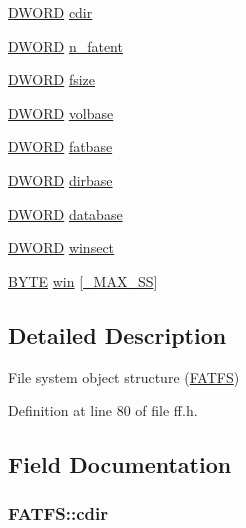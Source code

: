\begin{DoxyCompactItemize}
\item 
\hyperlink{integer_8h_ad342ac907eb044443153a22f964bf0af}{D\-W\-O\-R\-D} \hyperlink{structFATFS_a217d0ce0c8cec84aa7f0c142679412c6}{cdir}
\item 
\hyperlink{integer_8h_ad342ac907eb044443153a22f964bf0af}{D\-W\-O\-R\-D} \hyperlink{structFATFS_a8da50eeba6469bc20d60ca0cf9a1307c}{n\-\_\-fatent}
\item 
\hyperlink{integer_8h_ad342ac907eb044443153a22f964bf0af}{D\-W\-O\-R\-D} \hyperlink{structFATFS_a53e9560659f14e66f306c2c444198bf3}{fsize}
\item 
\hyperlink{integer_8h_ad342ac907eb044443153a22f964bf0af}{D\-W\-O\-R\-D} \hyperlink{structFATFS_a8f0ca578755749d204f59dc83f1a7649}{volbase}
\item 
\hyperlink{integer_8h_ad342ac907eb044443153a22f964bf0af}{D\-W\-O\-R\-D} \hyperlink{structFATFS_a848fba02c4aabe02ef2984e578f33d64}{fatbase}
\item 
\hyperlink{integer_8h_ad342ac907eb044443153a22f964bf0af}{D\-W\-O\-R\-D} \hyperlink{structFATFS_a3f72fd998dbcce4652a85a81fe944bc4}{dirbase}
\item 
\hyperlink{integer_8h_ad342ac907eb044443153a22f964bf0af}{D\-W\-O\-R\-D} \hyperlink{structFATFS_a5b6c0bc2e9fd2ae8ef714210a74a2d5d}{database}
\item 
\hyperlink{integer_8h_ad342ac907eb044443153a22f964bf0af}{D\-W\-O\-R\-D} \hyperlink{structFATFS_ac60e69c00e6bf7c25febfbac4dc1476b}{winsect}
\item 
\hyperlink{integer_8h_a4ae1dab0fb4b072a66584546209e7d58}{B\-Y\-T\-E} \hyperlink{structFATFS_a7cc35a593465e727ab87723c14610644}{win} \mbox{[}\hyperlink{ffconf_8h_ac271b697378912f17132cb9c7d0de024}{\-\_\-\-M\-A\-X\-\_\-\-S\-S}\mbox{]}
\end{DoxyCompactItemize}


\subsection{Detailed Description}
File system object structure (\hyperlink{structFATFS}{F\-A\-T\-F\-S}) 

Definition at line 80 of file ff.\-h.



\subsection{Field Documentation}
\hypertarget{structFATFS_a217d0ce0c8cec84aa7f0c142679412c6}{
\subsubsection[{cdir}]{ F\-A\-T\-F\-S\-::cdir}}\label{structFATFS_a217d0ce0c8cec84aa7f0c142679412c6}


